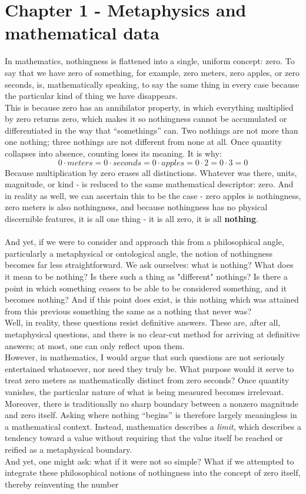 \documentclass{article}
\begin{document}
\newpage \section{Chapter 1 - Metaphysics and mathematical data}

In mathematics, nothingness is flattened into a single, uniform concept: zero. To say that we have zero of something, for example, zero meters, zero apples, or zero seconds, is, mathematically speaking, to say the same thing in every case because the particular kind of thing we have disappears. \\This is because zero has an annihilator property, in which everything multiplied by zero returns zero, which makes it so nothingness cannot be accumulated or differentiated in the way that “somethings” can. Two nothings are not more than one nothing; three nothings are not different from none at all. Once quantity collapses into absence, counting loses its meaning. It is why: $$0\cdot meters=0\cdot seconds = 0\cdot apples = 0 \cdot2=0\cdot3=0$$Because multiplication by zero erases all distinctions. Whatever was there, units, magnitude, or kind - is reduced to the same mathematical descriptor: zero. And in reality as well, we can ascertain this to be the case - zero apples is nothingness, zero meters is also nothingness, and because nothingness has no physical discernible features, it is all one thing - it is all zero, it is all \textbf{nothing}.\\\\ And yet, if we were to consider and approach this from a philosophical angle, particularly a metaphysical or ontological angle, the notion of nothingness becomes far less straightforward. We ask ourselves: what is nothing? What does it mean to be nothing? Is there such a thing as "different" nothings? Is there a point in which something ceases to be able to be considered something, and it becomes nothing? And if this point does exist, is this nothing which was attained from this previous something the same as a nothing that never was?\\Well, in reality, these questions resist definitive answers. These are, after all, metaphysical questions, and there is no clear-cut method for arriving at definitive answers; at most, one can only reflect upon them.\\ However, in mathematics, I would argue that such questions are not seriously entertained whatsoever, nor need they truly be. What purpose would it serve to treat zero meters as mathematically distinct from zero seconds? Once quantity vanishes, the particular nature of what is being measured becomes irrelevant. Moreover, there is traditionally no sharp boundary between a nonzero magnitude and zero itself. Asking where nothing “begins” is therefore largely meaningless in a mathematical context. Instead, mathematics describes a \textit{limit}, which describes a tendency toward a value without requiring that the value itself be reached or reified as a metaphysical boundary. \\ And yet, one might ask: what if it were not so simple? What if we attempted to integrate these philosophical notions of nothingness into the concept of zero itself, thereby reinventing the number 
\end{document}
